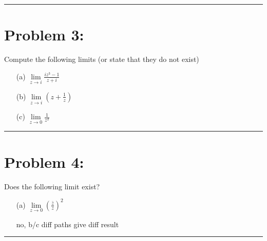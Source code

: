 \documentclass{article}
\begin{document}
\vspace{1cm} %

\hrule

\newpage
\section*{Problem 3:}
Compute the following limits (or state that they do not exist)
\begin{enumerate}
  \item[(a)] $\lim\limits_{z \to i} \frac{iz^3 - 1}{z + i}$
  \item[(b)] $\lim\limits_{z \to i}\left(z + \frac{1}{z}\right)$
  \item[(c)] $\lim\limits_{z \to 0}\frac{1}{z^2}$
\end{enumerate}
\vspace{1cm} %

\hrule

\newpage
\section*{Problem 4: }
Does the following limit exist?
\begin{enumerate}
\item[(a)] $\lim\limits_{z \to 0} \left(\frac{\bar{z}}{z}\right)^2$

  no, b/c diff paths give diff result
\end{enumerate}
\hrule
\end{document}
